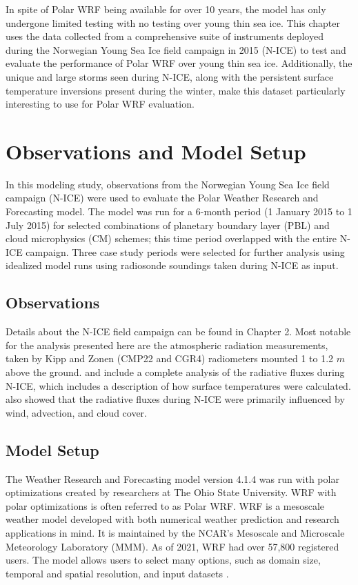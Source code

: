 In spite of Polar WRF being available for over 10 years, the model has only undergone limited testing with no testing over young thin sea ice. This chapter uses the data collected from a comprehensive suite of instruments deployed during the Norwegian Young Sea Ice field campaign in 2015 (N-ICE) to test and evaluate the performance of Polar WRF over young thin sea ice. Additionally, the unique and large storms seen during N-ICE, along with the persistent surface temperature inversions present during the winter, make this dataset particularly interesting to use for Polar WRF evaluation.

\section{Observations and Model Setup}
In this modeling study, observations from the Norwegian Young Sea Ice field campaign (N-ICE) were used to evaluate the Polar Weather Research and Forecasting model. The model was run for a 6-month period (1 January 2015 to 1 July 2015) for selected combinations of planetary boundary layer (PBL) and cloud microphysics (CM) schemes; this time period overlapped with the entire N-ICE campaign. Three case study periods were selected for further analysis using idealized model runs using radiosonde soundings taken during N-ICE as input.

\subsection{Observations}
Details about the N-ICE field campaign can be found in Chapter 2. Most notable for the analysis presented here are the atmospheric radiation measurements, taken by Kipp and Zonen (CMP22 and CGR4) radiometers mounted 1 to 1.2 $m$ above the ground. \citet{granskog:2015} and \citet{walden:2017} include a complete analysis of the radiative fluxes during N-ICE, which includes a description of how surface temperatures were calculated. \citet{walden:2017} also showed that the radiative fluxes during N-ICE were primarily influenced by wind, advection, and cloud cover. 

\subsection{Model Setup}

The Weather Research and Forecasting model version 4.1.4 was run with polar optimizations created by researchers at The Ohio State University. WRF with polar optimizations is often referred to as Polar WRF. WRF is a mesoscale weather model developed with both numerical weather prediction and research applications in mind. It is maintained by the NCAR's Mesoscale and Microscale Meteorology Laboratory (MMM). As of 2021, WRF had over 57,800 registered users. The model allows users to select many options, such as domain size, temporal and spatial resolution, and input datasets \citep{skamarock:2019}.

